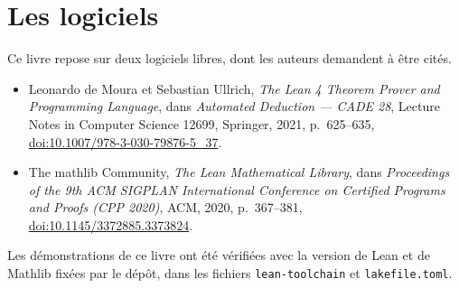 \section*{Les logiciels}

Ce livre repose sur deux logiciels libres, dont les auteurs demandent à être cités.

\begin{itemize}
\item Leonardo de Moura et Sebastian Ullrich,
\emph{The Lean 4 Theorem Prover and Programming Language},
dans \emph{Automated Deduction --- CADE 28}, Lecture Notes in Computer Science 12699,
Springer, 2021, p.~625--635,
\href{https://doi.org/10.1007/978-3-030-79876-5_37}{doi:10.1007/978-3-030-79876-5\_37}.

\item The mathlib Community,
\emph{The Lean Mathematical Library},
dans \emph{Proceedings of the 9th ACM SIGPLAN International Conference on Certified
Programs and Proofs (CPP 2020)}, ACM, 2020, p.~367--381,
\href{https://doi.org/10.1145/3372885.3373824}{doi:10.1145/3372885.3373824}.
\end{itemize}

\medskip\noindent
Les démonstrations de ce livre ont été vérifiées avec la version de Lean et de Mathlib
fixées par le dépôt, dans les fichiers \texttt{lean-toolchain} et \texttt{lakefile.toml}.
